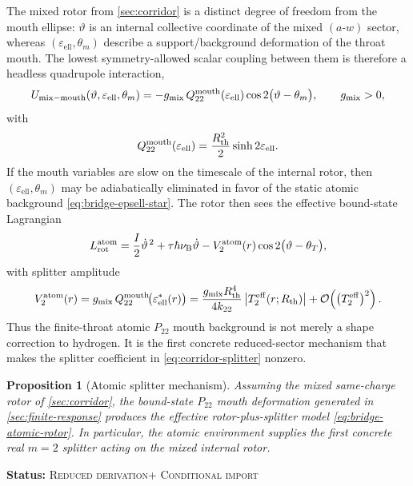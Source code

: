 \documentclass[11pt]{article}
\theoremstyle{plain}
\newtheorem{proposition}[theorem]{Proposition}
\theoremstyle{definition}
\theoremstyle{remark}
\newcommand{\statusReduced}{\textsc{Reduced derivation}}
\newcommand{\statusConditional}{\textsc{Conditional import}}
\newcommand{\claimstatus}[1]{\par\smallskip\noindent\textbf{Status:} #1\par\smallskip}
\newcommand{\Ptwotwo}{P_{22}}
\newcommand{\Rth}{R_{\mathrm{th}}}
\newcommand{\nuB}{\nu_{\mathrm{B}}}
\newcommand{\epsell}{\varepsilon_{\mathrm{ell}}}
\newcommand{\throt}{\vartheta}
\newcommand{\thmouth}{\theta_m}
\newcommand{\Order}[1]{\mathcal{O}\!\left(#1\right)}
\begin{document}
The mixed rotor from \cref{sec:corridor} is a distinct degree of freedom from the mouth ellipse: \(\throt\) is an internal collective coordinate of the mixed \((a\text{-}w)\) sector, whereas \((\epsell,\thmouth)\) describe a support/background deformation of the throat mouth. The lowest symmetry-allowed scalar coupling between them is therefore a headless quadrupole interaction,
\begin{equation}
U_{\rm mix-mouth}(\throt,\epsell,\thmouth)
=
-g_{\rm mix}\,Q_{22}^{\rm mouth}(\epsell)
\cos 2\bigl(\throt-\thmouth\bigr),
\qquad
g_{\rm mix}>0,
\label{eq:bridge-mix-mouth-coupling}
\end{equation}
with
\begin{equation}
Q_{22}^{\rm mouth}(\epsell)=\frac{\Rth^2}{2}\sinh 2\epsell.
\label{eq:bridge-mouth-Q22-epsell}
\end{equation}
If the mouth variables are slow on the timescale of the internal rotor, then \((\epsell,\thmouth)\) may be adiabatically eliminated in favor of the static atomic background \cref{eq:bridge-epsell-star}. The rotor then sees the effective bound-state Lagrangian
\begin{equation}
L_{\rm rot}^{\rm atom}
=
\frac{I}{2}\dot\throt^{\,2}
+\tau\hbar\nuB\dot\throt
-V_2^{\rm atom}(r)\cos 2\bigl(\throt-\theta_T\bigr),
\label{eq:bridge-atomic-rotor}
\end{equation}
with splitter amplitude
\begin{equation}
V_2^{\rm atom}(r)
=
g_{\rm mix}\,Q_{22}^{\rm mouth}\!\bigl(\epsell^{*}(r)\bigr)
=
\frac{g_{\rm mix}\Rth^4}{4k_{22}}\,\bigl|T_2^{\rm eff}(r;\Rth)\bigr|
+\Order{\bigl(T_2^{\rm eff}\bigr)^2}.
\label{eq:bridge-atomic-splitter-amplitude}
\end{equation}
Thus the finite-throat atomic \(\Ptwotwo\) mouth background is not merely a shape correction to hydrogen. It is the first concrete reduced-sector mechanism that makes the splitter coefficient in \cref{eq:corridor-splitter} nonzero.

\begin{proposition}[Atomic splitter mechanism]\label{prop:bridge-atomic-splitter}
Assuming the mixed same-charge rotor of \cref{sec:corridor}, the bound-state \(\Ptwotwo\) mouth deformation generated in \cref{sec:finite-response} produces the effective rotor-plus-splitter model \cref{eq:bridge-atomic-rotor}. In particular, the atomic environment supplies the first concrete real \(m=2\) splitter acting on the mixed internal rotor.
\end{proposition}
\claimstatus{\statusReduced + \statusConditional}
\end{document}
